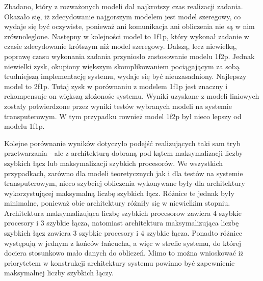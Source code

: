 \documentclass[a4paper,11pt, titlepage]{article}
\begin{document}
Zbadano, który z rozważonych modeli dał najkrotszy czas realizacji zadania. Okazało się, iż zdecydowanie najgorszym modelem jest model szeregowy, co wydaje się być oczywiste, ponieważ ani komunikacja ani obliczenia nie są w nim zrównoleglone. Następny w kolejności model to 1f1p, który wykonał zadanie w czasie zdecydowanie krótszym niż model szeregowy. Dalszą, lecz niewielką, poprawę czasu wykonania zadania przyniosło zastosowanie modelu 1f2p. Jednak niewielki zysk, okupiony większym skomplikowaniem pociągającym za sobą trudniejszą implementację systemu, wydaje się być nieuzasadniony. Najlepszy model to 2f1p. Tutaj zysk w porównaniu z modelem 1f1p jest znaczny i rekompensuje on większą złożonośc systemu. Wyniki uzyskane z modeli liniowych zostały potwierdzone przez wyniki testów wybranych modeli na systemie transputerowym. W tym przypadku rownież model 1f2p był nieco lepszy od modelu 1f1p.

Kolejne porównanie wyników dotyczyło podejść realizujących taki sam tryb przetwarzania - ale z architekturą dobraną pod kątem maksymalizacji liczby szybkich łącz lub maksymalizacji szybkich procesorów. We wszystkich przypadkach, zarówno dla modeli teoretycznych jak i dla testów na systemie transputerowym, nieco szybciej obliczenia wykonywane były dla architektury wykorzystującej maksymalną liczbę szybkich łącz. Różnice te jednak były minimalne, ponieważ obie architektury różniły się w niewielkim stopniu. Architektura maksymalizująca liczbę szybkich procesorow zawiera 4 szybkie procesory i 3 szybkie łącza, natomiast architektura maksymalizująca liczbę szybkich łącz zawiera 3 szybkie procesory i 4 szybkie łącza. Ponadto różnice występują w jednym z końców łańcucha, a więc w strefie systemu, do której dociera stosunkowo mało danych do obliczeń. Mimo to można wnioskować iż priorytetem w konstrukcji architektury systemu powinno być zapewnienie maksymalnej liczby szybkich łączy.
\end{document}
